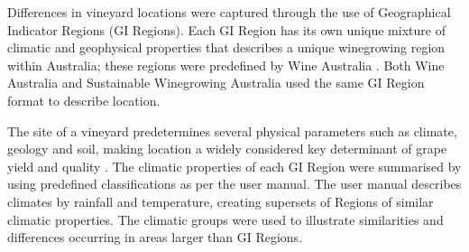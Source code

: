 \documentclass[review,12pt,authoryear]{elsarticle}
\begin{document}
\begin{linenumbers}
\par
Differences in vineyard locations were captured through the use of Geographical Indicator Regions (GI Regions). Each GI Region has its own unique mixture of climatic and geophysical properties that describes a unique winegrowing region within Australia; these regions were predefined by Wine Australia \citep{hallidayAustralianWineEncyclopedia2009,oliverReviewSoilPhysical2013,soarClimateDriversRed2008}. Both Wine Australia and Sustainable Winegrowing Australia used the same GI Region format to describe location.
\par
The site of a vineyard predetermines several physical parameters such as climate, geology and soil, making location a widely considered key determinant of grape yield and quality \citep{abbalDecisionSupportSystem2016,agostaRegionalClimateVariability2012,fragaMultivariateClusteringViticultural2017}. The climatic properties of each GI Region were summarised by using predefined classifications as per the \citet{sustainablewinegrowingaustraliaSustainableWinegrowingAustralia2021} user manual. The user manual describes climates by rainfall and temperature, creating supersets of Regions of similar climatic properties. The climatic groups were used to illustrate similarities and differences occurring in areas larger than GI Regions.
\par

\end{linenumbers}
\end{document}
